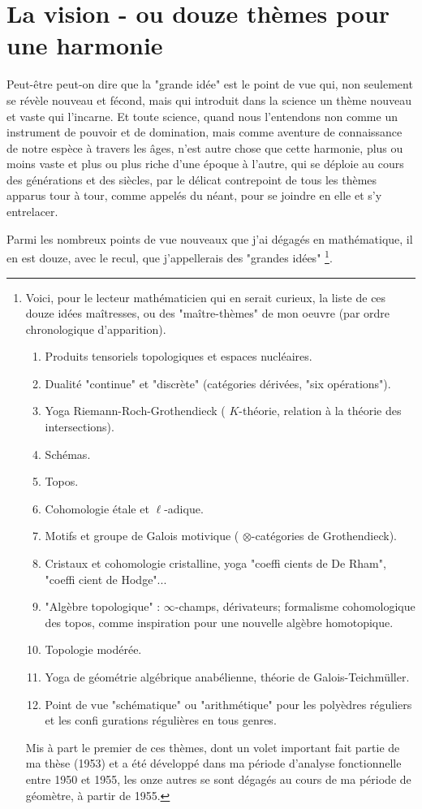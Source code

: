 \section{La vision - ou douze thèmes pour une harmonie}

Peut-être peut-on dire que la "grande idée" est le point de vue qui, non seulement se révèle nouveau et fécond, mais qui introduit dans la science un thème nouveau et vaste qui l'incarne. Et toute science, quand nous l'entendons non comme un instrument de pouvoir et de domination, mais comme aventure de connaissance de notre espèce à travers les âges, n'est autre chose que cette harmonie, plus ou moins vaste et plus ou plus riche d'une époque à l'autre, qui se déploie au cours des générations et des siècles, par le délicat contrepoint de tous les thèmes apparus tour à tour, comme appelés du néant, pour se joindre en elle et s'y entrelacer.

Parmi les nombreux points de vue nouveaux que j'ai dégagés en mathématique, il en est douze, avec le recul, que j'appellerais des "grandes idées" \footnote{Voici, pour le lecteur mathématicien qui en serait curieux, la liste de ces douze idées maîtresses, ou des "maître-thèmes" de mon oeuvre (par ordre chronologique d'apparition).

\begin{enumerate}
    \item Produits tensoriels topologiques et espaces nucléaires.
    \item Dualité "continue" et "discrète" (catégories dérivées, "six opérations").
    \item Yoga Riemann-Roch-Grothendieck ( $K$-théorie, relation à la théorie des intersections).
    \item Schémas.
    \item Topos.
    \item Cohomologie étale et $\ell$-adique.
    \item Motifs et groupe de Galois motivique ( $\otimes$-catégories de Grothendieck).
    \item Cristaux et cohomologie cristalline, yoga "coeffi cients de De Rham", "coeffi cient de Hodge"...
    \item "Algèbre topologique" : $\infty$-champs, dérivateurs; formalisme cohomologique des topos, comme inspiration pour une nouvelle algèbre homotopique.
    \item Topologie modérée.
    \item Yoga de géométrie algébrique anabélienne, théorie de Galois-Teichmüller.
    \item Point de vue "schématique" ou "arithmétique" pour les polyèdres réguliers et les confi gurations régulières en tous genres.
\end{enumerate}

Mis à part le premier de ces thèmes, dont un volet important fait partie de ma thèse (1953) et a été développé dans ma période d'analyse fonctionnelle entre 1950 et 1955, les onze autres se sont dégagés au cours de ma période de géomètre, à partir de 1955.}.

